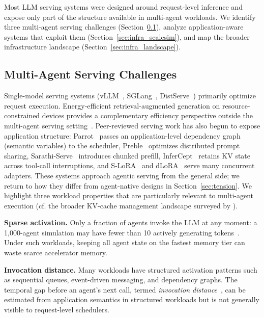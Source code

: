 Most LLM serving systems were designed around request-level inference and expose only part of the structure available in multi-agent workloads. We identify three multi-agent serving challenges (Section~\ref{sec:infra_challenges}), analyze application-aware systems that exploit them (Section~\ref{sec:infra_scalesim}), and map the broader infrastructure landscape (Section~\ref{sec:infra_landscape}).

\subsection{Multi-Agent Serving Challenges}\label{sec:infra_challenges}

Single-model serving systems (vLLM~\cite{kwon2023}, SGLang~\cite{sglang2024}, DistServe~\cite{distserve2024}) primarily optimize request execution. Energy-efficient retrieval-augmented generation on resource-constrained devices provides a complementary efficiency perspective outside the multi-agent serving setting~\cite{cheng2026toward}. Peer-reviewed serving work has also begun to expose application structure: Parrot~\cite{parrot2024} passes an application-level dependency graph (semantic variables) to the scheduler, Preble~\cite{preble2025} optimizes distributed prompt sharing, Sarathi-Serve~\cite{sarathi2024} introduces chunked prefill, InferCept~\cite{infercept2024} retains KV state across tool-call interruptions, and S-LoRA~\cite{slora2024} and dLoRA~\cite{dlora2024} serve many concurrent adapters. These systems approach agentic serving from the general side; we return to how they differ from agent-native designs in Section~\ref{sec:tension}. We highlight three workload properties that are particularly relevant to multi-agent execution (cf. the broader KV-cache management landscape surveyed by \cite{kvcachesurvey2026}).

\textbf{Sparse activation.} Only a fraction of agents invoke the LLM at any moment: a 1,000-agent simulation may have fewer than 10 actively generating tokens~\cite{zhou2026}. Under such workloads, keeping all agent state on the fastest memory tier can waste scarce accelerator memory.

\textbf{Invocation distance.} Many workloads have structured activation patterns such as sequential queues, event-driven messaging, and dependency graphs. The temporal gap before an agent's next call, termed \emph{invocation distance}~\cite{zhou2026}, can be estimated from application semantics in structured workloads but is not generally visible to request-level schedulers.

